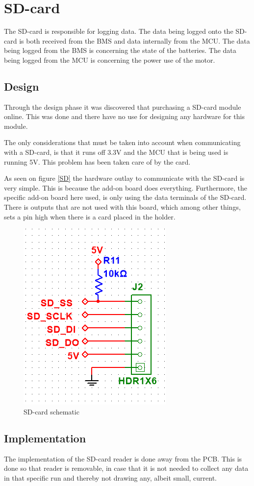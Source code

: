 \section{SD-card}
The SD-card is responsible for logging data. The data being logged onto the SD-card is both received from the BMS and data internally from the MCU. The data being logged from the BMS is concerning the state of the batteries. The data being logged from the MCU is concerning the power use of the motor.

\subsection{Design}
Through the design phase it was discovered that purchasing a SD-card module online. This was done and there have no use for designing any hardware for this module. 

The only considerations that must be taken into account when communicating with a SD-card, is that it runs off 3.3V and the MCU that is being used is running 5V. This problem has been taken care of by the card.

As seen on figure \vref{SD} the hardware outlay to communicate with the SD-card is very simple. This is because the add-on board does everything. Furthermore, the specific add-on board here used, is only using the data terminals of the SD-card. There is outputs that are not used with this board, which among other things, sets a pin high when there is a card placed in the holder. 

\begin{figure}[H]
	\centering
	\includegraphics[width=0.4\linewidth]{Hardware/Pictures/SD_card}
	\caption{SD-card schematic}
	\label{fig:SD}
\end{figure}

\subsection{Implementation}
The implementation of the SD-card reader is done away from the PCB. This is done so that reader is removable, in case that it is not needed to collect any data in that specific run and thereby not drawing any, albeit small, current.  

